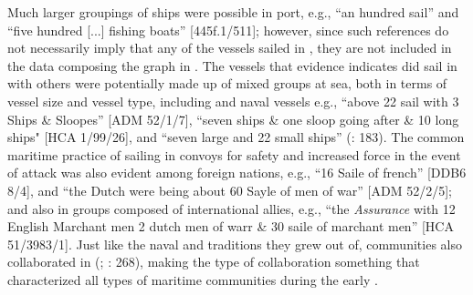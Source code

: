 Much larger groupings of ships were possible in port, e.g., “an hundred sail” and “five hundred [...] fishing boats” [445f.1/511]; however, since such references do not necessarily imply that any of the vessels sailed in , they are not included in the data composing the graph in . The vessels that evidence indicates did sail in  with others were potentially made up of mixed groups at sea, both in terms of vessel size and vessel type, including  and naval vessels e.g., “above 22 sail with 3  Ships \& Sloopes” [ADM 52/1/7], “seven ships \& one sloop going after \& 10 long ships" [HCA 1/99/26], and “seven large and 22 small ships” (\citealt{Bicheno2012}: 183). The common maritime practice of sailing in convoys for safety and increased force in the event of attack was also evident among foreign nations, e.g., “16 Saile of french” [DDB6 8/4], and “the Dutch were being about 60 Sayle of men of war” [ADM 52/2/5]; and also in groups composed of international allies, e.g., “the \textit{Assurance} with 12 English Marchant men 2 dutch men of warr \& 30 saile of marchant men” [HCA 51/3983/1]. Just like the naval and  traditions they grew out of,  communities also collaborated in  (\citealt{Esquemelin1678}; \citealt{Rediker1987}: 268), making the type of collaboration something that characterized all types of  maritime communities during the early . 

